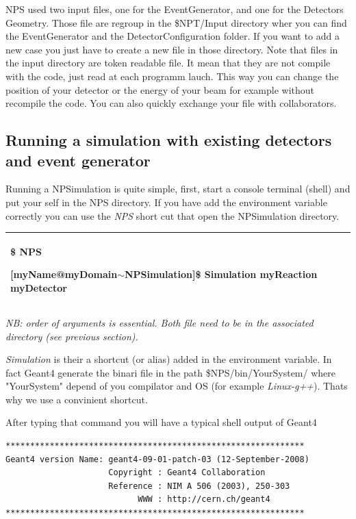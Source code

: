 \documentclass{book}
\begin{document}
NPS used two input files, one for the EventGenerator, and one for the Detectors Geometry. Those file are regroup in the \$NPT/Input directory wher you can find the EventGenerator and the DetectorConfiguration folder. If you want to add a new case you just have to create a new file in those directory. Note that files in the input directory are token readable file. It mean that they are not compile with the code, just read at each programm lauch. This way you can change the position of your detector or the energy of your beam for example without recompile the code. You can also quickly exchange your file with collaborators.

\subsection{ Running a simulation with existing detectors and event generator }

Running a NPSimulation is quite simple, first, start a console terminal (shell) and put your self in the NPS directory. If you have add the environment variable correctly you can use the \emph{NPS} short cut that open the NPSimulation directory.
	
	\begin{footnotesize}
	\begin{center}
	\begin{tabular}{|p{\textwidth}|}
		\hline
			[myName@myDomain$\sim$ ]\${} NPS
			
			[myName@myDomain$\sim$NPSimulation]\${} Simulation myReaction myDetector
		\\
		\hline
	\end{tabular}
	\end{center}
	\end{footnotesize}
	
\emph{NB: order of arguments is essential. Both file need to be in the associated directory (see previous section).}

\emph{Simulation} is their a shortcut (or alias) added in the environment variable. In fact Geant4 generate the binari file in the path \$NPS/bin/YourSystem/ where "YourSystem" depend of you compilator and OS (for example \emph{Linux-g++}). Thats why we use a convinient shortcut.

After typing that command you will have a typical shell output of Geant4
\begin{verbatim}
*************************************************************
Geant4 version Name: geant4-09-01-patch-03 (12-September-2008)
                     Copyright : Geant4 Collaboration
                     Reference : NIM A 506 (2003), 250-303
                           WWW : http://cern.ch/geant4
*************************************************************
\end{verbatim}
\end{document}
